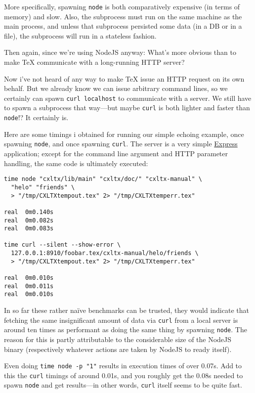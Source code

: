 More specifically, spawning \texttt{node} is both comparatively
expensive (in terms of memory) and slow. Also, the subprocess must run
on the same machine as the main process, and unless that subprocess
persisted some data (in a DB or in a file), the subprocess will run in a
stateless fashion.

Then again, since we're using NodeJS anyway: What's more obvious than to
make TeX communicate with a long-running HTTP server?

Now i've not heard of any way to make TeX issue an HTTP request on its
own behalf. But we already know we can issue arbitrary command lines, so
we certainly can spawn \texttt{curl localhost} to communicate with a
server. We still have to spawn a subprocess that way---but maybe
\texttt{curl} is both lighter and faster than \texttt{node}!? It
certainly is.

Here are some timings i obtained for running our simple echoing example,
once spawning \texttt{node}, and once spawning \texttt{curl}. The server
is a very simple \href{http://expressjs.com/}{Express} application;
except for the command line argument and HTTP parameter handling, the
same code is ultimately executed:

\begin{verbatim}
time node "cxltx/lib/main" "cxltx/doc/" "cxltx-manual" \
  "helo" "friends" \
  > "/tmp/CXLTXtempout.tex" 2> "/tmp/CXLTXtemperr.tex"

real  0m0.140s
real  0m0.082s
real  0m0.083s

time curl --silent --show-error \
  127.0.0.1:8910/foobar.tex/cxltx-manual/helo/friends \
  > "/tmp/CXLTXtempout.tex" 2> "/tmp/CXLTXtemperr.tex"

real  0m0.010s
real  0m0.011s
real  0m0.010s
\end{verbatim}

In so far these rather naïve benchmarks can be trusted, they would
indicate that fetching the same insignificant amount of data via
\texttt{curl} from a local server is around ten times as performant as
doing the same thing by spawning \texttt{node}. The reason for this is
partly attributable to the considerable size of the NodeJS binary
(respectively whatever actions are taken by NodeJS to ready itself).

Even doing \texttt{time node -p "1"} results in execution times of over
0.07s. Add to this the \texttt{curl} timings of around 0.01s, and you
roughly get the 0.08s needed to spawn \texttt{node} and get results---in
other words, \texttt{curl} itself seems to be quite fast.

